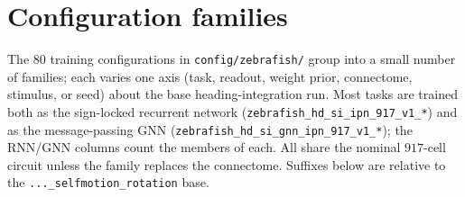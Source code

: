 \documentclass[11pt]{article}
\begin{document}
\section{Configuration families}
\label{app:config_families}

The $80$ training configurations in \texttt{config/zebrafish/} group into a
small number of families; each varies one axis (task, readout, weight prior,
connectome, stimulus, or seed) about the base heading-integration run. Most
tasks are trained both as the sign-locked recurrent network
(\texttt{zebrafish\_hd\_si\_ipn\_917\_v1\_*}) and as the message-passing GNN
(\texttt{zebrafish\_hd\_si\_gnn\_ipn\_917\_v1\_*}); the RNN/GNN columns count
the members of each. All share the nominal $917$-cell circuit unless the family
replaces the connectome. Suffixes below are relative to the
\texttt{...\_selfmotion\_rotation} base.
\end{document}
